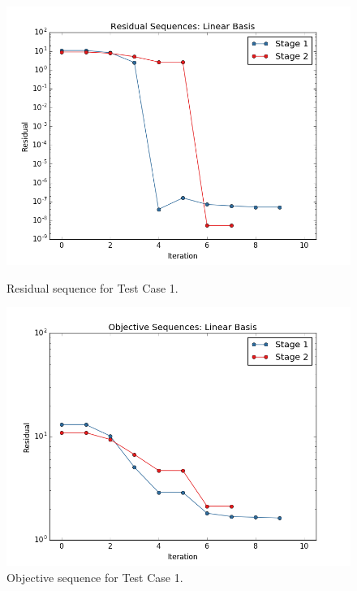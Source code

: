 \documentclass[]{aiaa-tc}%
\begin{document}
\begin{figure}[!ht]
\centering
\begin{minipage}{.50\textwidth}
 \centering
 \includegraphics[width=.8\textwidth]{../images/residual_case1}
 \caption{Residual sequence for Test Case 1.}
 \label{fig:residual_case1}
\end{minipage}%
\begin{minipage}{.50\textwidth}
 \centering
 \includegraphics[width=.8\textwidth]{../images/objective_case1}
 \caption{Objective sequence for Test Case 1.}
 \label{fig:objective_case1}
\end{minipage}
\end{figure}
\end{document}
